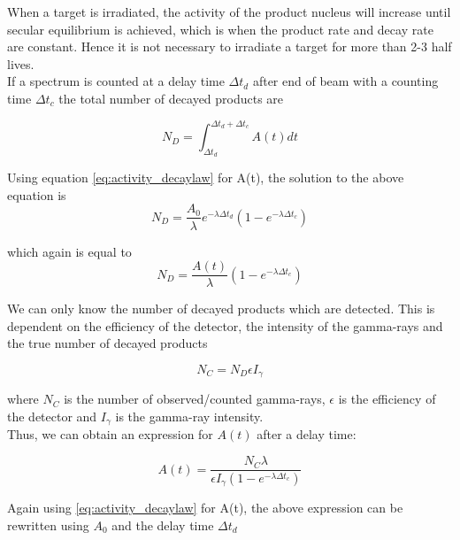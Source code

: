 \noindent 
When a target is irradiated, the activity of the product nucleus will increase until secular equilibrium is achieved, which is when the product rate and decay rate are constant. Hence it is not necessary to irradiate a target for more than 2-3 half lives.\\

\noindent 
If a spectrum is counted at a delay time $\Delta t_d$ after end of beam with a counting time $\Delta t_c$  the total number of decayed products are 

\begin{equation}
    N_D = \int_{\Delta t_d}^{\Delta t_d + \Delta t_c} A(t) dt
\end{equation}

Using equation \ref{eq:activity_decaylaw} for A(t), the solution to the above equation is 
\begin{equation} \label{eq:numb_of_decayed}
    N_D= \frac{A_0}{\lambda}e^{-\lambda \Delta t_d}(1-e^{-\lambda \Delta t_c})
\end{equation}

which again is equal to
\begin{equation}
    N_D = \frac{A(t)}{\lambda} (1-e^{-\lambda \Delta t_c})
\end{equation}

We can only know the number of decayed products which are detected. This is dependent on the efficiency of the detector, the intensity of the gamma-rays and the true number of decayed products

\begin{equation}\label{eq:Ngamma}
    N_C  = N_D \epsilon I_\gamma
\end{equation}

where $N_C$ is the number of observed/counted gamma-rays, $\epsilon$ is the efficiency of the detector and $I_\gamma$ is the gamma-ray intensity.\\ 

\noindent
Thus, we can obtain an expression for $A(t)$ after a delay time: 

\begin{equation} \label{eq:Final_Expression_A}
    A(t) = \frac{N_C \lambda}{\epsilon I_\gamma (1-e^{-\lambda \Delta t_c})}
\end{equation}

\noindent 
Again using \ref{eq:activity_decaylaw} for A(t), the above expression can be rewritten using $A_0$ and the delay time $\Delta t_d$

